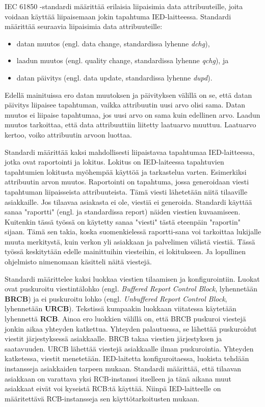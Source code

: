 IEC 61850 -standardi määrittää erilaisia liipaisimia data attribuuteille, joita voidaan käyttää liipaisemaan jokin tapahtuma IED-laitteessa. Standardi määrittää seuraavia liipaisimia data attribuuteille:
\begin{itemize}
	\item datan muutos (engl. data change, standardissa lyhenne \emph{dchg}),
	\item laadun muutos (engl. quality change, standardissa lyhenne \emph{qchg}), ja
	\item datan päivitys (engl. data update, standardissa lyhenne \emph{dupd}).
\end{itemize}
Edellä mainituissa ero datan muutoksen ja päivityksen välillä on se, että datan päivitys liipaisee tapahtuman, vaikka attribuutin uusi arvo olisi sama. Datan muutos ei liipaise tapahtumaa, jos uusi arvo on sama kuin edellinen arvo. Laadun muutos tarkoittaa, että data attribuuttiin liitetty laatuarvo muuttuu. Laatuarvo kertoo, voiko attribuutin arvoon luottaa. \cite[s.~90]{IEC61850-7-1}

Standardi määrittää kaksi mahdollisesti liipaistavaa tapahtumaa IED-laitteessa, jotka ovat raportointi ja lokitus. Lokitus on IED-laiteessa tapahtuvien tapahtumien lokitusta myöhempää käyttöä ja tarkastelua varten. Esimerkiksi attribuutin arvon muutos. Raportointi on tapahtuma, jossa generoidaan viesti tapahtuman liipaisseista attribuuteista. Tämä viesti lähetetään niitä tilaaville asiakkaille. Jos tilaavaa asiakasta ei ole, viestiä ei generoida. Standardi käyttää sanaa "raportti" (engl. ja standardissa report) näiden viestien kuvaamiseen. Kuitenkin tässä työssä on käytetty sanaa "viesti" tästä eteenpäin "raportin" sijaan. Tämä sen takia, koska suomenkielessä raportti-sana voi tarkoittaa lukijalle muuta merkitystä, kuin verkon yli asiakkaan ja palvelimen välistä viestiä. Tässä työssä keskitytään edelle mainittuihin viesteihin, ei lokitukseen. Ja lopullinen ohjelmisto nimenomaan käsitteli näitä viestejä.

Standardi määrittelee kaksi luokkaa viestien tilaamisen ja konfigurointiin. Luokat ovat puskuroitu viestintälohko (engl. \emph{Buffered Report Control Block}, lyhennetään \textbf{BRCB}) ja ei puskuroitu lohko (engl. \emph{Unbuffered Report Control Block}, lyhennetään \textbf{URCB}). Tekstissä kumpaakin luokkaan viitatessa käytetään lyhennettä \textbf{RCB}. Ainoa ero luokkien välillä on, että BRCB puskuroi viestejä jonkin aikaa yhteyden katkettua. Yhteyden palautuessa, se lähettää puskuroidut viestit järjestyksessä asiakkaalle. BRCB takaa viestien järjestyksen ja saatavuuden. URCB lähettää viestejä asiakkaalle ilman puskurointia. Yhteyden katketessa, viestit menetetään. IED-laitetta konfiguroitaessa, luokista tehdään instansseja asiakkaiden tarpeen mukaan. Standardi määrittää, että tilaavan asiakkaan on varattava yksi RCB-instanssi itselleen ja tänä aikana muut asiakkaat eivät voi kyseistä RCB:tä käyttää. Niinpä IED-laitteelle on määritettävä RCB-instansseja sen käyttötarkoitusten mukaan.

